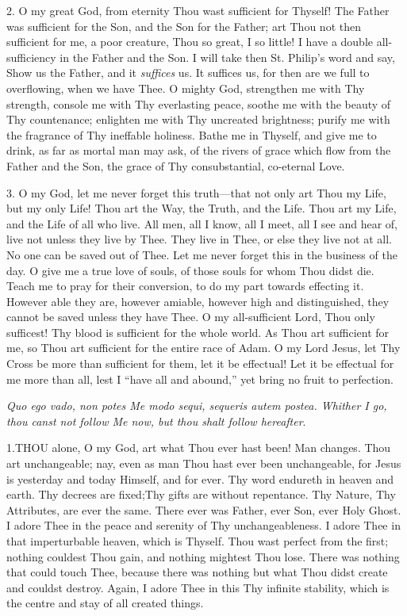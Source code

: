 2. O my great God, from eternity
Thou wast sufficient for Thyself! The Father was sufficient for the Son,
and the Son for the Father; art Thou not then sufficient for me, a poor
creature, Thou so great, I so little! I have a double all-sufficiency in
the Father and the Son. I will take then St. Philip's word and say, Show
us the Father, and it \emph{suffices} us. It suffices us, for then are
we full to overflowing, when we have Thee. O mighty God, strengthen me
with Thy strength, console me with Thy everlasting peace, soothe me with
the beauty of Thy countenance; enlighten me with Thy uncreated
brightness; purify me with the fragrance of Thy ineffable holiness.
Bathe me in Thyself, and give me to drink, as far as mortal man may ask,
of the rivers of grace which flow from the Father and the Son, the grace
of Thy consubstantial, co-eternal Love.

3. O my God, let me never forget
this truth—that not only art Thou my Life, but my only Life! Thou art
the Way, the Truth, and the Life. Thou art my Life, and the Life
of all who live. All men, all I know, all I meet, all I see and hear of,
live not unless they live by Thee. They live in Thee, or else they live
not at all. No one can be saved out of Thee. Let me never forget this in
the business of the day. O give me a true love of souls, of those souls
for whom Thou didst die. Teach me to pray for their conversion, to do my
part towards effecting it. However able they are, however amiable,
however high and distinguished, they cannot be saved unless they have
Thee. O my all-sufficient Lord, Thou only sufficest! Thy blood is
sufficient for the whole world. As Thou art sufficient for me, so Thou
art sufficient for the entire race of Adam. O my Lord Jesus, let Thy
Cross be more than sufficient for them, let it be effectual! Let it be
effectual for me more than all, lest I ``have all and abound,'' yet bring
no fruit to perfection.


\emph{Quo
ego vado, non potes Me modo sequi, sequeris autem postea. Whither I go, thou canst not follow Me now, but thou shalt follow
hereafter}.

1.\emph{}THOU
alone, O my God, art what Thou ever hast been! Man changes. Thou art
unchangeable; nay, even as man Thou hast ever been unchangeable, for
Jesus is yesterday and today Himself, and for ever. Thy word endureth in
heaven and earth. Thy decrees are fixed;\emph{}Thy gifts are without
repentance. Thy Nature, Thy Attributes, are ever the same. There ever
was Father, ever Son, ever Holy Ghost. I adore Thee in the peace and
serenity of Thy unchangeableness. I adore Thee in that imperturbable
heaven, which is Thyself. Thou wast perfect from the first; nothing
couldest Thou gain, and nothing mightest Thou lose. There was nothing
that could touch Thee, because there was nothing but what Thou didst
create and couldst destroy. Again, I adore Thee in this Thy infinite
stability, which is the centre and stay of all created things.

